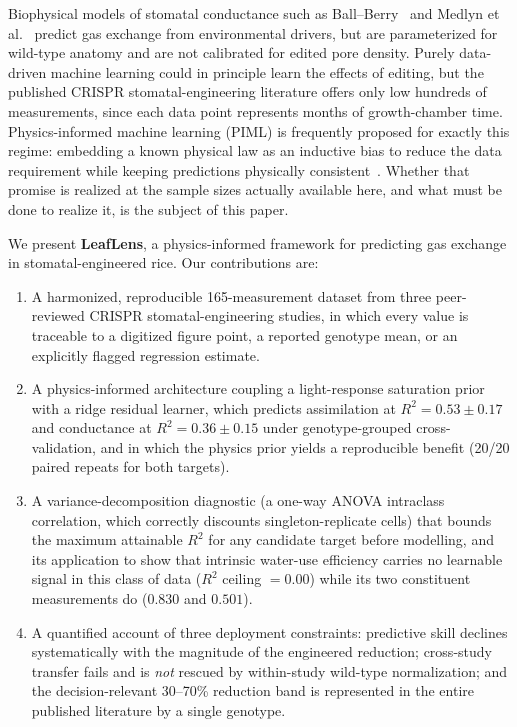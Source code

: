 \documentclass[runningheads]{llncs}
\begin{document}
Biophysical models of stomatal conductance such as Ball--Berry~\cite{ref_ball_berry} and Medlyn et al.~\cite{ref_medlyn} predict gas exchange from environmental drivers, but are parameterized for wild-type anatomy and are not calibrated for edited pore density. Purely data-driven machine learning could in principle learn the effects of editing, but the published CRISPR stomatal-engineering literature offers only low hundreds of measurements, since each data point represents months of growth-chamber time. Physics-informed machine learning (PIML) is frequently proposed for exactly this regime: embedding a known physical law as an inductive bias to reduce the data requirement while keeping predictions physically consistent~\cite{ref_karniadakis,ref_willard}. Whether that promise is realized at the sample sizes actually available here, and what must be done to realize it, is the subject of this paper.

We present \textbf{LeafLens}, a physics-informed framework for predicting gas exchange in stomatal-engineered rice. Our contributions are:

\begin{enumerate}
    \item A harmonized, reproducible 165-measurement dataset from three peer-reviewed CRISPR stomatal-engineering studies, in which every value is traceable to a digitized figure point, a reported genotype mean, or an explicitly flagged regression estimate.
    \item A physics-informed architecture coupling a light-response saturation prior with a ridge residual learner, which predicts assimilation at $R^{2}=0.53\pm0.17$ and conductance at $R^{2}=0.36\pm0.15$ under genotype-grouped cross-validation, and in which the physics prior yields a reproducible benefit (20/20 paired repeats for both targets).
    \item A variance-decomposition diagnostic (a one-way ANOVA intraclass correlation, which correctly discounts singleton-replicate cells) that bounds the maximum attainable $R^{2}$ for any candidate target before modelling, and its application to show that intrinsic water-use efficiency carries no learnable signal in this class of data ($R^{2}$ ceiling $=0.00$) while its two constituent measurements do ($0.830$ and $0.501$).
    \item A quantified account of three deployment constraints: predictive skill declines systematically with the magnitude of the engineered reduction; cross-study transfer fails and is \emph{not} rescued by within-study wild-type normalization; and the decision-relevant 30--70\% reduction band is represented in the entire published literature by a single genotype.
\end{enumerate}
\end{document}
